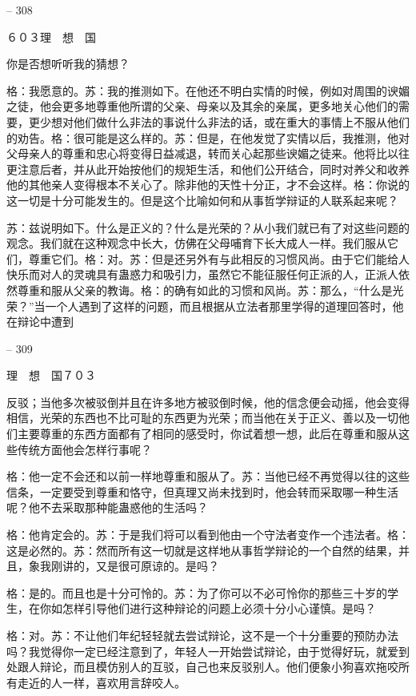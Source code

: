 \documentclass[11pt,oneside]{book}
\begin{document}
\begin{common-format}
    

-- 308

    ６０３理　想　国

    你是否想听听我的猜想？

    格：我愿意的。苏：我的推测如下。在他还不明白实情的时候，例如对周围的谀媚之徒，他会更多地尊重他所谓的父亲、母亲以及其余的亲属，更多地关心他们的需要，更少想对他们做什么非法的事说什么非法的话，或在重大的事情上不服从他们的劝告。格：很可能是这么样的。苏：但是，在他发觉了实情以后，我推测，他对父母亲人的尊重和忠心将变得日益减退，转而关心起那些谀媚之徒来。他将比以往更注意后者，并从此开始按他们的规矩生活，和他们公开结合，同时对养父和收养他的其他亲人变得根本不关心了。除非他的天性十分正，才不会这样。格：你说的这一切是十分可能发生的。但是这个比喻如何和从事哲学辩证的人联系起来呢？

    苏：兹说明如下。什么是正义的？什么是光荣的？从小我们就已有了对这些问题的观念。我们就在这种观念中长大，仿佛在父母哺育下长大成人一样。我们服从它们，尊重它们。格：对。苏：但是还另外有与此相反的习惯风尚。由于它们能给人快乐而对人的灵魂具有蛊惑力和吸引力，虽然它不能征服任何正派的人，正派人依然尊重和服从父亲的教诲。格：的确有如此的习惯和风尚。苏：那么，“什么是光荣？”当一个人遇到了这样的问题，而且根据从立法者那里学得的道理回答时，他在辩论中遭到

    

-- 309

    理　想　国７０３

    反驳；当他多次被驳倒并且在许多地方被驳倒时候，他的信念便会动摇，他会变得相信，光荣的东西也不比可耻的东西更为光荣；而当他在关于正义、善以及一切他们主要尊重的东西方面都有了相同的感受时，你试着想一想，此后在尊重和服从这些传统方面他会怎样行事呢？

    格：他一定不会还和以前一样地尊重和服从了。苏：当他已经不再觉得以往的这些信条，一定要受到尊重和恪守，但真理又尚未找到时，他会转而采取哪一种生活呢？他不去采取那种能蛊惑他的生活吗？

    格：他肯定会的。苏：于是我们将可以看到他由一个守法者变作一个违法者。格：这是必然的。苏：然而所有这一切就是这样地从事哲学辩论的一个自然的结果，并且，象我刚讲的，又是很可原谅的。是吗？

    格：是的。而且也是十分可怜的。苏：为了你可以不必可怜你的那些三十岁的学生，在你如怎样引导他们进行这种辩论的问题上必须十分小心谨慎。是吗？

    格：对。苏：不让他们年纪轻轻就去尝试辩论，这不是一个十分重要的预防办法吗？我觉得你一定已经注意到了，年轻人一开始尝试辩论，由于觉得好玩，就爱到处跟人辩论，而且模仿别人的互驳，自己也来反驳别人。他们便象小狗喜欢拖咬所有走近的人一样，喜欢用言辞咬人。


\end{common-format}
\end{document}
